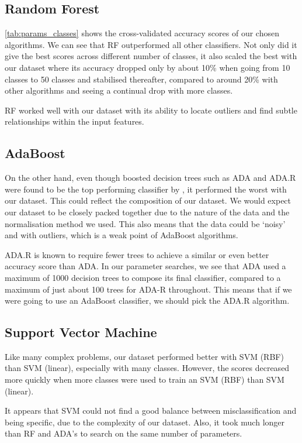 \subsection*{Random Forest}
\autoref{tab:params_classes} shows the cross-validated accuracy scores of our chosen algorithms. We can see that RF outperformed all other classifiers. Not only did it give the best scores across different number of classes, it also scaled the best with our dataset where its accuracy dropped only by about 10\% when going from 10 classes to 50 classes and stabilised thereafter, compared to around 20\% with other algorithms and seeing a continual drop with more classes. 

RF worked well with our dataset with its ability to locate outliers and find subtle relationships within the input features. 

\subsection*{AdaBoost}
On the other hand, even though boosted decision trees such as ADA and ADA.R were found to be the top performing classifier by , it performed the worst with our dataset. This could reflect the composition of our dataset. We would expect our dataset to be closely packed together due to the nature of the data and the normalisation method we used. This also means that the data could be `noisy' and with outliers, which is a weak point of AdaBoost algorithms.

ADA.R is known to require fewer trees to achieve a similar or even better accuracy score than ADA. In our parameter searches, we see that ADA used a maximum of 1000 decision trees to compose its final classifier, compared to a maximum of just about 100 trees for ADA-R throughout. This means that if we were going to use an AdaBoost classifier, we should pick the ADA.R algorithm.


\subsection*{Support Vector Machine}
Like many complex problems, our dataset performed better with SVM (RBF) than SVM (linear), especially with many classes. However, the scores decreased more quickly when more classes were used to train an SVM (RBF) than SVM (linear).

It appears that SVM could not find a good balance between misclassification and being specific, due to the complexity of our dataset. Also, it took much longer than RF and ADA's to search on the same number of parameters.

